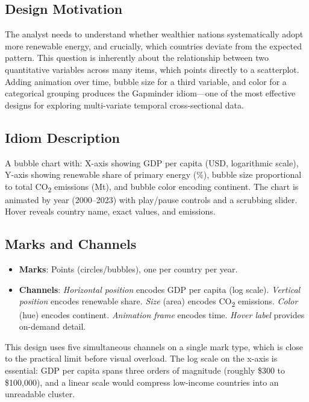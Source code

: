 \documentclass[10pt]{article}
\begin{document}
\subsection{Design Motivation}

The analyst needs to understand whether wealthier nations systematically adopt more renewable energy, and crucially, which countries deviate from the expected pattern. This question is inherently about the relationship between two quantitative variables across many items, which points directly to a scatterplot. Adding animation over time, bubble size for a third variable, and color for a categorical grouping produces the Gapminder idiom---one of the most effective designs for exploring multi-variate temporal cross-sectional data.

\subsection{Idiom Description}

A bubble chart with: X-axis showing GDP per capita (USD, logarithmic scale), Y-axis showing renewable share of primary energy (\%), bubble size proportional to total CO\textsubscript{2} emissions (Mt), and bubble color encoding continent. The chart is animated by year (2000--2023) with play/pause controls and a scrubbing slider. Hover reveals country name, exact values, and emissions.

\subsection{Marks and Channels}

\begin{itemize}
    \item \textbf{Marks}: Points (circles/bubbles), one per country per year.
    \item \textbf{Channels}: \emph{Horizontal position} encodes GDP per capita (log scale). \emph{Vertical position} encodes renewable share. \emph{Size} (area) encodes CO\textsubscript{2} emissions. \emph{Color} (hue) encodes continent. \emph{Animation frame} encodes time. \emph{Hover label} provides on-demand detail.
\end{itemize}

This design uses five simultaneous channels on a single mark type, which is close to the practical limit before visual overload. The log scale on the x-axis is essential: GDP per capita spans three orders of magnitude (roughly \$300 to \$100{,}000), and a linear scale would compress low-income countries into an unreadable cluster.
\end{document}
